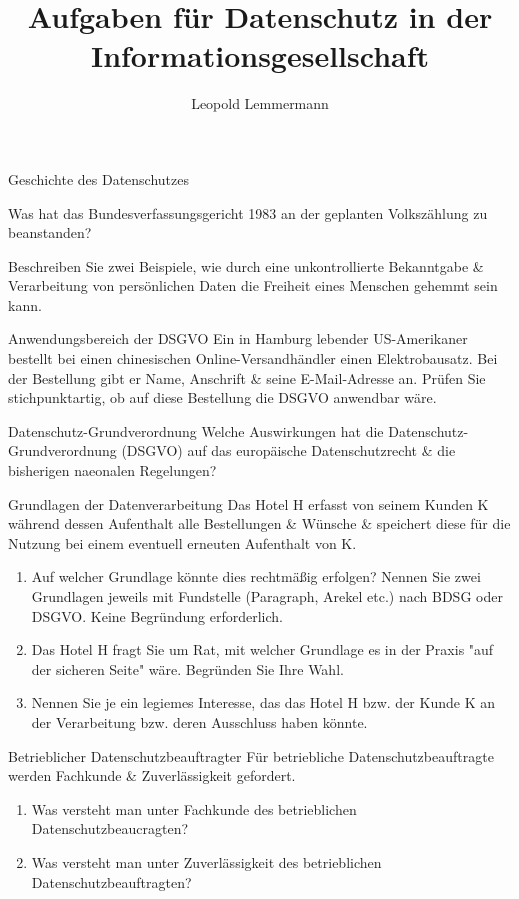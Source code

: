 \documentclass{exercisesheet}
\title{Aufgaben für Datenschutz in der Informationsgesellschaft}
\author{Leopold Lemmermann}
\begin{document}
\createtitle

\begin{exercise}{Geschichte des Datenschutzes}
  \item Was hat das Bundesverfassungsgericht 1983 an der geplanten Volkszählung zu beanstanden?
  \item Beschreiben Sie zwei Beispiele, wie durch eine unkontrollierte Bekanntgabe \& Verarbeitung von persönlichen Daten die Freiheit eines Menschen gehemmt sein kann.
\end{exercise}

\begin{exercise*}{Anwendungsbereich der DSGVO}
  Ein in Hamburg lebender US-Amerikaner bestellt bei einen chinesischen Online-Versandhändler einen Elektrobausatz. Bei der Bestellung gibt er Name, Anschrift \& seine E-Mail-Adresse an. Prüfen Sie stichpunktartig, ob auf diese Bestellung die DSGVO anwendbar wäre.
\end{exercise*}

\begin{exercise*}{Datenschutz-Grundverordnung}
  Welche Auswirkungen hat die Datenschutz-Grundverordnung (DSGVO) auf das europäische Datenschutzrecht \& die bisherigen naeonalen Regelungen?
\end{exercise*}

\begin{exercise*}{Grundlagen der Datenverarbeitung}
  Das Hotel H erfasst von seinem Kunden K während dessen Aufenthalt alle Bestellungen \& Wünsche \& speichert diese für die Nutzung bei einem eventuell erneuten Aufenthalt von K.
  \begin{enumerate}
    \item Auf welcher Grundlage könnte dies rechtmäßig erfolgen? Nennen Sie zwei Grundlagen jeweils mit Fundstelle (Paragraph, Arekel etc.) nach BDSG oder DSGVO. Keine Begründung erforderlich.
    \item Das Hotel H fragt Sie um Rat, mit welcher Grundlage es in der Praxis "auf der sicheren Seite" wäre. Begründen Sie Ihre Wahl.
    \item Nennen Sie je ein legiemes Interesse, das das Hotel H bzw. der Kunde K an der Verarbeitung bzw. deren Ausschluss haben könnte.
  \end{enumerate}
\end{exercise*}

\begin{exercise*}{Betrieblicher Datenschutzbeauftragter}
  Für betriebliche Datenschutzbeauftragte werden Fachkunde \& Zuverlässigkeit gefordert.
  \begin{enumerate}
    \item Was versteht man unter Fachkunde des betrieblichen Datenschutzbeaucragten?
    \item Was versteht man unter Zuverlässigkeit des betrieblichen Datenschutzbeauftragten?
  \end{enumerate}
\end{exercise*}
\end{document}
